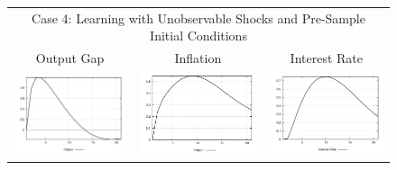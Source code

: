 \begin{figure}
\begin{tabular}{ccc}
\multicolumn{3}{c}{Case 4: Learning with Unobservable Shocks and Pre-Sample Initial Conditions}\\
Output Gap & Inflation & Interest Rate \\ 
\includegraphics[scale=0.28]{results_wlsinit/Output_natshock_irf.png} & 
\includegraphics[scale=0.28]{results_wlsinit/Inflation_natshock_irf.png} & 
\includegraphics[scale=0.28]{results_wlsinit/Interest_Rate_natshock_irf.png} \\ 
\end{tabular}
\end{figure}

